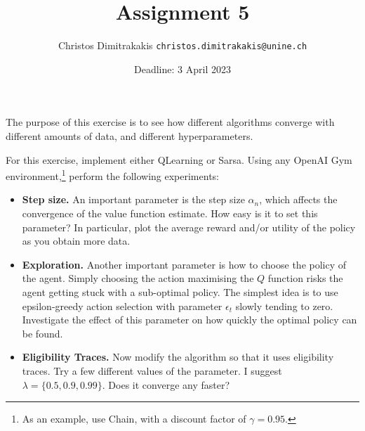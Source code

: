 \documentclass[twoside,a4paper]{article}
\begin{document}
\title{Assignment 5}
\author{Christos Dimitrakakis  \texttt{christos.dimitrakakis@unine.ch}}
\date{Deadline: 3 April 2023}
\maketitle

The purpose of this exercise is to see how different algorithms converge with different amounts of data, and different hyperparameters.

For this exercise, implement either QLearning or Sarsa. Using any OpenAI Gym environment,\footnote{As an example, use Chain, with a discount factor of $\gamma = 0.95$.} perform the following experiments:
\begin{itemize}
\item \textbf{Step size.} An important parameter is the step size  $\alpha_n$, which affects the convergence of the value function estimate. How easy is it to set this parameter? In particular, plot the average reward and/or utility of the policy as you obtain more data.
\item \textbf{Exploration.} Another important parameter is how to choose the policy of the agent. Simply choosing the action maximising the $Q$ function risks the agent getting stuck with a sub-optimal policy. The simplest idea is to use epsilon-greedy action selection  with parameter $\epsilon_t$ slowly tending to zero. Investigate the effect of this parameter on how quickly the optimal policy can be found.
\item \textbf{Eligibility Traces.}  Now modify the algorithm so that it uses eligibility traces. Try a few different values of the parameter. I suggest $\lambda = \{0.5, 0.9, 0.99\}$. Does it converge any faster?
  

\end{itemize}
\end{document}
